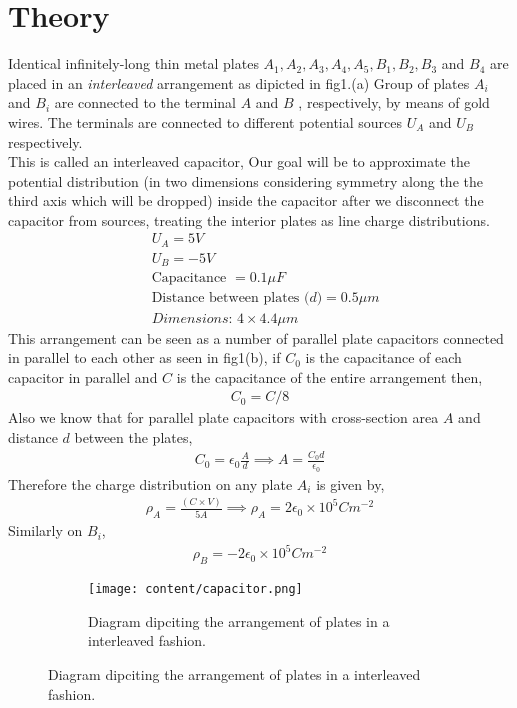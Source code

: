 \section{Theory}
Identical infinitely-long thin metal plates $A_1,A_2,A_3,A_4,A_5,B_1,B_2,B_3 $ and $B_4$ are placed in an \textit{interleaved} arrangement as dipicted in fig1.(a) Group of plates $A_i$ and $B_i$ are connected to the terminal $A$ and $B$ , respectively, by means of gold wires. The terminals are connected to different potential sources $U_A$ and $U_B$ respectively. \\
This is called an interleaved capacitor, Our goal will be to approximate the potential distribution (in two dimensions considering symmetry along the the third axis which will be dropped) inside the capacitor after we disconnect the capacitor from sources, treating the interior plates as line charge distributions.
\begin{align*}
    &U_A = 5V \\
    &U_B = -5V \\
    &\text{Capacitance } = 0.1\mu F\\
    &\text{Distance between plates ($d$)} = 0.5\mu m \\
    &\textit{Dimensions: } 4 \times 4.4 \mu m  
\end{align*}
This arrangement can be seen as a number of parallel plate capacitors connected in parallel to each other as seen in fig1(b),
if $C_0$ is the capacitance of each capacitor in parallel and $C$ is the capacitance of the entire arrangement then,
\begin{align*}
    C_0 = C/8
\end{align*}
Also we know that for parallel plate capacitors with cross-section area $A$ and distance $d$ between the plates,
\begin{align}
    C_0 = \epsilon_0 \frac{A}{d} \implies A = \frac{C_0d}{\epsilon_0}
\end{align}
Therefore the charge distribution on any plate $A_i$ is given by,
\begin{align}
    \rho_A = \frac{(C \times V )}{5A} \implies \rho_A = 2\epsilon_0 \times 10^5C m^{-2} 
\end{align}
Similarly on $B_i$,
\begin{align}
    \rho_B = -2\epsilon_0 \times 10^5C m^{-2} 
\end{align}

\begin{figure}[h]
    \centering
    \begin{subfigure}[b]{\linewidth}
    \texttt{[image: content/capacitor.png]}
    \caption{\small Diagram dipciting the arrangement of plates in a interleaved fashion.}
    \label{fig 1: the capacitor}
    \end{subfigure}
\end{figure}

